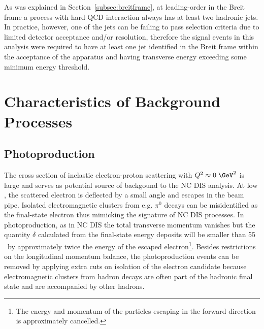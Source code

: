As was explained in Section~\ref{subsec:breitframe}, at leading-order in the Breit frame a process with hard QCD interaction always has at least two hadronic jets. In practice, however, one of the jets can be failing to pass selection criteria due to limited detector acceptance and/or resolution, therefore the signal events in this analysis were required to have at least one jet identified in the Breit frame within the acceptance of the apparatus and having transverse energy exceeding some minimum energy threshold.

\section{Characteristics of Background Processes}
\label{sec:bgchar}

\subsection{Photoproduction}
\label{subsec:photoprodbg}
The cross section of inelastic electron-proton scattering with $\qsq \approx 0\;\GeV^2$ is large and serves as potential source of backgound to the NC DIS analysis. At low \qsq, the scattered electron is deflected by a small angle and escapes in the beam pipe. Isolated electromagnetic clusters from e.g. $\pi^0$ decays can be misidentified as the final-state electron thus mimicking the signature of NC DIS processes. In photoproduction, as in NC DIS the total transverse momentum vanishes but the quantity $\delta$ calculated from the final-state energy deposits will be smaller than 55 \GeV~by approximately twice the energy of the escaped electron\footnote{The energy and momentum of the particles escaping in the forward direction is approximately cancelled.}. Besides restrictions on the longitudinal momentum balance, the photoproduction events can be removed by applying extra cuts on isolation of the electron candidate because electromagnetic clusters from hadron decays are often part of the hadronic final state and are accompanied by other hadrons.

